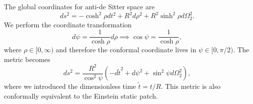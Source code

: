 \begin{solution}
    The global coordinates for anti-de Sitter space are
    \begin{equation}
        ds^2 = -\cosh^2\rho dt^2 + R^2d\rho^2+R^2\sinh^2\rho d\Omega_2^2.
    \end{equation}
    We perform the coordinate transformation
    \begin{equation}
        d\psi = \frac{1}{\cosh\rho}d\rho\implies \cos\psi = \frac{1}{\cosh\rho},
    \end{equation}
    where $\rho\in [0,\infty)$ and therefore the conformal coordinate lives in $\psi\in [0,\pi/2)$. The metric becomes
    \begin{equation}
        ds^2 = \frac{R^2}{\cos^2\psi}(-d\tilde{t}^2 + d\psi^2 + \sin^2\psi d\Omega_2^2),
    \end{equation}
    where we introduced the dimensionless time $\tilde{t}= t/R$. This metric is also conformally equivalent to the Einstein static patch.
\end{solution}


